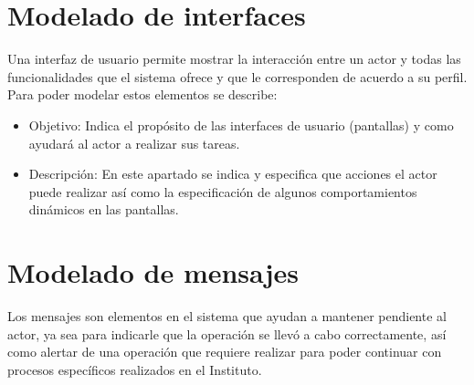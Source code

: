 \section{Modelado de interfaces}

Una interfaz de usuario permite mostrar la interacción entre un actor y todas las funcionalidades que el sistema ofrece y que le corresponden de acuerdo a su perfil. Para poder modelar estos elementos se describe:
\begin{itemize}
	\item Objetivo: Indica el propósito de las interfaces de usuario (pantallas) y como ayudará al actor a realizar sus tareas.
	\item Descripción: En este apartado se indica y especifica que acciones el actor puede realizar así como la especificación de algunos comportamientos dinámicos en las pantallas.
\end{itemize}

%

\section{Modelado de mensajes}

Los mensajes son elementos en el sistema que ayudan a mantener pendiente al actor, ya sea para indicarle que la operación se llevó a cabo correctamente, así como alertar de una operación que requiere realizar para poder continuar con procesos específicos realizados en el Instituto.

